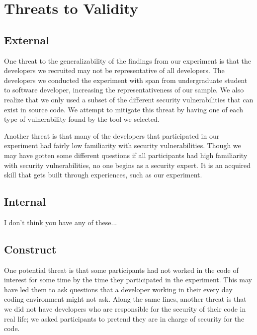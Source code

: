 \documentclass[conference]{IEEEtran}
\begin{document}
\section{Threats to Validity}
\label{limits}

\subsection{External}
One threat to the generalizability of the findings from our experiment is that the developers we recruited may not be representative of all developers.
The developers we conducted the experiment with span from undergraduate student to software developer, increasing the representativeness of our sample. We also realize that we only used a subset of the different security vulnerabilities that can exist in source code. We attempt to mitigate this threat by having one of each type of vulnerability found by the tool we selected. 

Another threat is that many of the developers that participated in our experiment had fairly low familiarity with security vulnerabilities. Though we may have gotten some different questions if all participants had high familiarity with security vulnerabilities, no one begins as a security expert. It is an acquired skill that gets built through experiences, such as our experiment.


\subsection{Internal}

I don't think you have any of these...

\subsection{Construct}

One potential threat is that some participants had not worked in the code of interest for some time by the time they participated in the experiment. This may have led them to ask questions that a developer working in their every day coding environment might not ask. 
Along the same lines, another threat is that we did not have developers who are responsible for the security of their code in real life; we asked participants to pretend they are in charge of security for the code.  
\end{document}
